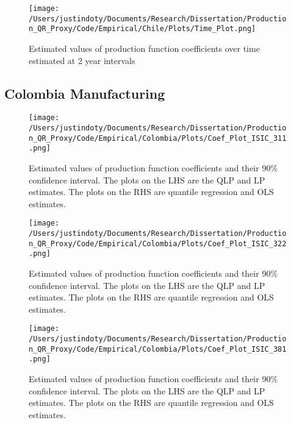 \documentclass[11pt]{article}
\begin{document}
\begin{figure}[H]
\centering
\texttt{[image: /Users/justindoty/Documents/Research/Dissertation/Production\_QR\_Proxy/Code/Empirical/Chile/Plots/Time\_Plot.png]}
\caption{Estimated values of production function coefficients over time estimated at 2 year intervals}
\end{figure}



\subsection{Colombia Manufacturing}




\begin{figure}[H]
\centering
\texttt{[image: /Users/justindoty/Documents/Research/Dissertation/Production\_QR\_Proxy/Code/Empirical/Colombia/Plots/Coef\_Plot\_ISIC\_311.png]}
\caption{Estimated values of production function coefficients and their 90\% confidence interval. The plots on the LHS are the QLP and LP estimates. The plots on the RHS are quantile regression and OLS estimates.}
\end{figure}

\begin{figure}[H]
\centering
\texttt{[image: /Users/justindoty/Documents/Research/Dissertation/Production\_QR\_Proxy/Code/Empirical/Colombia/Plots/Coef\_Plot\_ISIC\_322.png]}
\caption{Estimated values of production function coefficients and their 90\% confidence interval. The plots on the LHS are the QLP and LP estimates. The plots on the RHS are quantile regression and OLS estimates.}
\end{figure}

\begin{figure}[H]
\centering
\texttt{[image: /Users/justindoty/Documents/Research/Dissertation/Production\_QR\_Proxy/Code/Empirical/Colombia/Plots/Coef\_Plot\_ISIC\_381.png]}
\caption{Estimated values of production function coefficients and their 90\% confidence interval. The plots on the LHS are the QLP and LP estimates. The plots on the RHS are quantile regression and OLS estimates.}
\end{figure}
\end{document}
